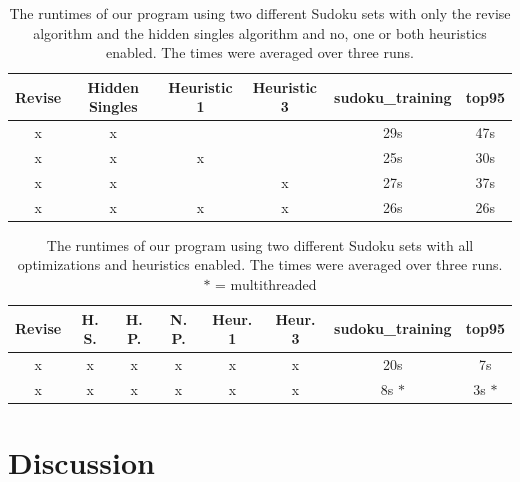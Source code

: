\documentclass[11pt]{article} %
\begin{document}
\begin{table}[hp]
\begin{center}
\begin{tabular}{c c c c c c}
\hline
 Revise & Hidden Singles & Heuristic 1 & Heuristic 3 & sudoku\_training & top95 \\
\hline
x & x &  &  & 29s & 47s \\ %
x & x & x &  & 25s & 30s \\ %
x & x &  & x & 27s & 37s \\ %
x & x & x & x & 26s & 26s \\ %
\hline
\end{tabular}
\end{center}
\caption{The runtimes of our program using two different Sudoku sets with only the revise algorithm and the hidden singles algorithm and no, one or both heuristics enabled. The times were averaged over three runs.}
\label{tab:hs+heur_results}
\end{table}

\begin{table}[hp]
\begin{center}
\begin{tabular}{c c c c c c c c}
\hline
 Revise & H. S. & H. P. & N. P. & Heur. 1 & Heur. 3 & sudoku\_training & top95 \\
\hline
x & x & x & x & x & x & 20s & 7s \\ 
x & x & x & x & x & x & 8s $*$ & 3s $*$ \\
\hline
\end{tabular}
\end{center}
\caption{The runtimes of our program using two different Sudoku sets with all optimizations and heuristics enabled. The times were averaged over three runs. \\ $*$ = multithreaded}
\label{tab:alles_aan}
\end{table}

\section{Discussion}
\end{document}
